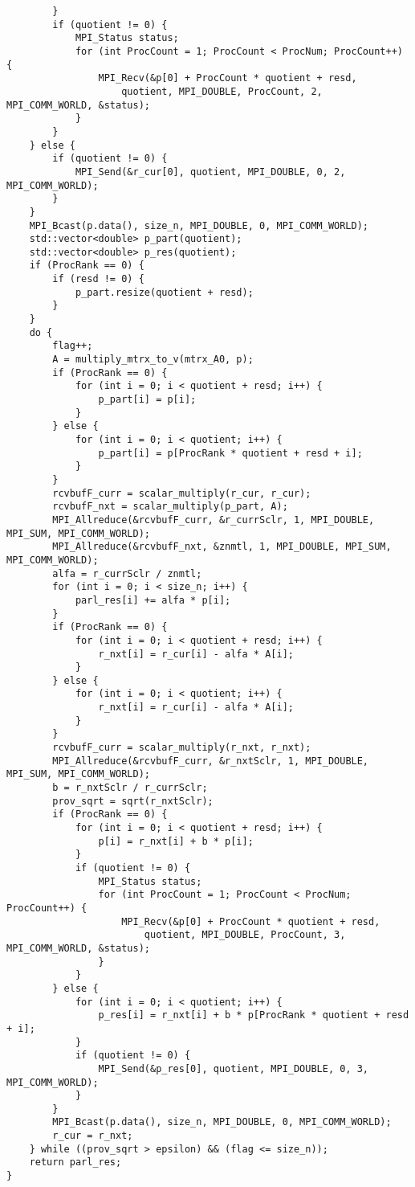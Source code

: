 \documentclass{report}
\begin{document}
\begin{lstlisting}
        }
        if (quotient != 0) {
            MPI_Status status;
            for (int ProcCount = 1; ProcCount < ProcNum; ProcCount++) {
                MPI_Recv(&p[0] + ProcCount * quotient + resd,
                    quotient, MPI_DOUBLE, ProcCount, 2, MPI_COMM_WORLD, &status);
            }
        }
    } else {
        if (quotient != 0) {
            MPI_Send(&r_cur[0], quotient, MPI_DOUBLE, 0, 2, MPI_COMM_WORLD);
        }
    }
    MPI_Bcast(p.data(), size_n, MPI_DOUBLE, 0, MPI_COMM_WORLD);
    std::vector<double> p_part(quotient);
    std::vector<double> p_res(quotient);
    if (ProcRank == 0) {
        if (resd != 0) {
            p_part.resize(quotient + resd);
        }
    }
    do {
        flag++;
        A = multiply_mtrx_to_v(mtrx_A0, p);
        if (ProcRank == 0) {
            for (int i = 0; i < quotient + resd; i++) {
                p_part[i] = p[i];
            }
        } else {
            for (int i = 0; i < quotient; i++) {
                p_part[i] = p[ProcRank * quotient + resd + i];
            }
        }
        rcvbufF_curr = scalar_multiply(r_cur, r_cur);
        rcvbufF_nxt = scalar_multiply(p_part, A);
        MPI_Allreduce(&rcvbufF_curr, &r_currSclr, 1, MPI_DOUBLE, MPI_SUM, MPI_COMM_WORLD);
        MPI_Allreduce(&rcvbufF_nxt, &znmtl, 1, MPI_DOUBLE, MPI_SUM, MPI_COMM_WORLD);
        alfa = r_currSclr / znmtl;
        for (int i = 0; i < size_n; i++) {
            parl_res[i] += alfa * p[i];
        }
        if (ProcRank == 0) {
            for (int i = 0; i < quotient + resd; i++) {
                r_nxt[i] = r_cur[i] - alfa * A[i];
            }
        } else {
            for (int i = 0; i < quotient; i++) {
                r_nxt[i] = r_cur[i] - alfa * A[i];
            }
        }
        rcvbufF_curr = scalar_multiply(r_nxt, r_nxt);
        MPI_Allreduce(&rcvbufF_curr, &r_nxtSclr, 1, MPI_DOUBLE, MPI_SUM, MPI_COMM_WORLD);
        b = r_nxtSclr / r_currSclr;
        prov_sqrt = sqrt(r_nxtSclr);
        if (ProcRank == 0) {
            for (int i = 0; i < quotient + resd; i++) {
                p[i] = r_nxt[i] + b * p[i];
            }
            if (quotient != 0) {
                MPI_Status status;
                for (int ProcCount = 1; ProcCount < ProcNum; ProcCount++) {
                    MPI_Recv(&p[0] + ProcCount * quotient + resd,
                        quotient, MPI_DOUBLE, ProcCount, 3, MPI_COMM_WORLD, &status);
                }
            }
        } else {
            for (int i = 0; i < quotient; i++) {
                p_res[i] = r_nxt[i] + b * p[ProcRank * quotient + resd + i];
            }
            if (quotient != 0) {
                MPI_Send(&p_res[0], quotient, MPI_DOUBLE, 0, 3, MPI_COMM_WORLD);
            }
        }
        MPI_Bcast(p.data(), size_n, MPI_DOUBLE, 0, MPI_COMM_WORLD);
        r_cur = r_nxt;
    } while ((prov_sqrt > epsilon) && (flag <= size_n));
    return parl_res;
}
\end{lstlisting}
\end{document}
